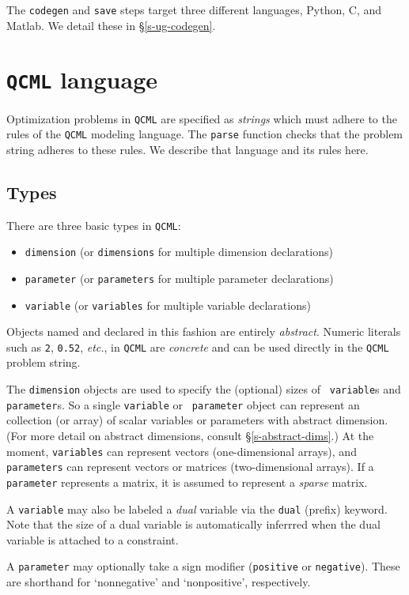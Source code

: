 \documentclass[11pt]{article}
\def\qcml{\texttt{QCML}\xspace}
\newcommand{\etc}{{\it etc.}}
\begin{document}
The {\tt codegen} and {\tt save} steps target three different languages,
Python, C, and Matlab. We detail these in \S\ref{s-ug-codegen}.

\section{\qcml language}
\label{s-ug-language}
Optimization problems in \qcml are specified as \emph{strings} which must adhere to
the rules of the \qcml modeling language. The {\tt parse} function checks that
the problem string adheres to these rules. We describe that language and its
rules here.

\subsection{Types}
There are three basic types in \qcml:
\begin{itemize}
\item {\tt dimension} (or {\tt dimensions} for multiple dimension declarations)
\item {\tt parameter} (or {\tt parameters} for multiple parameter declarations)
\item {\tt variable} (or {\tt variables} for multiple variable declarations)
\end{itemize}
Objects named and declared in this fashion are entirely \emph{abstract}.
Numeric literals such as {\tt 2}, {\tt 0.52}, \etc, in \qcml are
\emph{concrete} and can be used directly in the \qcml problem string.

The {\tt dimension} objects are used to specify the (optional) sizes of {\tt
variable}s and {\tt parameter}s. So a single {\tt variable} or {\tt
parameter} object can represent an collection (or array) of scalar variables
or parameters with abstract dimension. (For more detail on abstract
dimensions, consult \S\ref{s-abstract-dims}.) At the moment, {\tt variables}
can represent vectors (one-dimensional arrays), and {\tt parameters} can
represent vectors or matrices (two-dimensional arrays). If a {\tt parameter}
represents a matrix, it is assumed to represent a \emph{sparse} matrix.

A {\tt variable} may also be labeled a \emph{dual} variable via the
{\tt dual} (prefix) keyword. Note that the size of a dual
variable is automatically inferrred when the dual variable is attached
to a constraint.

A {\tt parameter} may optionally take a sign modifier ({\tt positive} or
{\tt negative}). These are shorthand for `nonnegative' and `nonpositive',
respectively.
\end{document}
